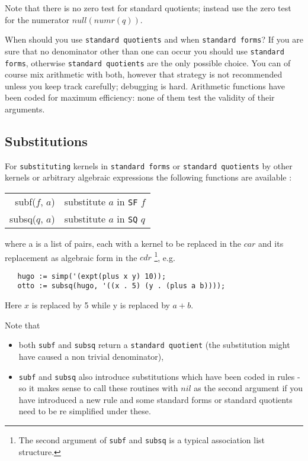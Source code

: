 \documentclass[11pt]{article}
\makeatletter
\newcommand{\ttindex}[1]{\index{#1@{\texttt{#1}}}}
\makeatother
\begin{document}
Note that there is no zero test for standard quotients; instead
use the zero test for the numerator $null(numr(q))$.

When should you use \texttt{standard quotients} and when \texttt{standard forms}?
If you are sure that no denominator other
than one can occur you should use \texttt{standard forms}, otherwise
\texttt{standard quotients} are the only possible choice. You can of course
mix arithmetic with both, however that strategy is
not recommended unless you keep track carefully;
debugging is hard. Arithmetic functions have been coded
for maximum efficiency: none of them test the validity of their
arguments.

\subsection{Substitutions}

For \texttt{substituting}\ttindex{substituting} kernels in \texttt{standard forms}
or  \texttt{standard quotients}
by other kernels or arbitrary algebraic expressions the
following functions are available :
\begin{center}
\begin{tabular}{|r|l|} \hline
    subf($f$, $a$) & substitute $a$ in \texttt{SF} $f$ \\
    subsq($q$, $a$) & substitute $a$ in \texttt{SQ} $q$ \\
\hline
\end{tabular}
\end{center}
where a is a list of pairs, each with a kernel to be replaced
in the $car$ and its replacement as algebraic form in the $cdr$
\footnote{The second argument of \texttt{subf} and \texttt{subsq}
is a typical association list structure.},
e.g.
\begin{verbatim}
   hugo := simp('(expt(plus x y) 10));
   otto := subsq(hugo, '((x . 5) (y . (plus a b))));
\end{verbatim}
Here $x$ is replaced by 5 while y is replaced by $a+b$.

Note that
\begin{itemize}
\item both \texttt{subf} and \texttt{subsq} return a \texttt{standard quotient}
(the substitution might have caused a non trivial denominator),
\item \texttt{subf} and \texttt{subsq} also introduce substitutions which have been
coded in rules - so it makes sense to call these routines with
$nil$ as the second argument if you have introduced a new rule and
some standard forms or standard quotients need to be re simplified
under these.
\end{itemize}
\end{document}

